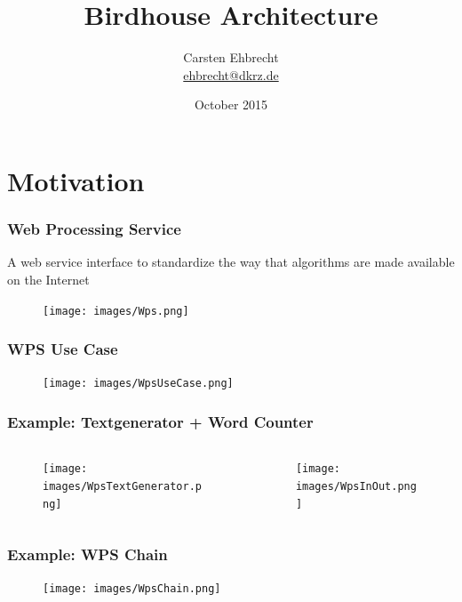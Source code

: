 \documentclass{beamer}
\title{Birdhouse Architecture}
\author{
Carsten Ehbrecht\\
\medskip
{\scriptsize \url{ehbrecht@dkrz.de}}
}
\institute{German Climate Computing Center (DKRZ)}
\date{October 2015}
\begin{document}
  \begin{frame}[plain]
    \titlepage
  \end{frame}


  \section{Motivation}

  \begin{frame}[plain]
    \frametitle{Web Processing Service}
    A web service interface to standardize the way that algorithms are made available on the Internet
    \begin{figure}
      \texttt{[image: images/Wps.png]}
    \end{figure}
  \end{frame}

  \begin{frame}[plain]
    \frametitle{WPS Use Case}
    \begin{figure}
      \texttt{[image: images/WpsUseCase.png]}
    \end{figure}
  \end{frame}

  \begin{frame}[plain]
    \frametitle{Example: Textgenerator + Word Counter}
    \begin{columns}[T] %
      \begin{column}[T]{5cm} %
        \begin{figure}
          \texttt{[image: images/WpsTextGenerator.png]}
        \end{figure}
      \end{column}
      \begin{column}[T]{5cm} %
        \begin{figure}
          \texttt{[image: images/WpsInOut.png]}
        \end{figure}
      \end{column}
    \end{columns}
  \end{frame}

  \begin{frame}[plain]
    \frametitle{Example: WPS Chain}
    \begin{figure}
      \texttt{[image: images/WpsChain.png]}
    \end{figure}
  \end{frame}
\end{document}

